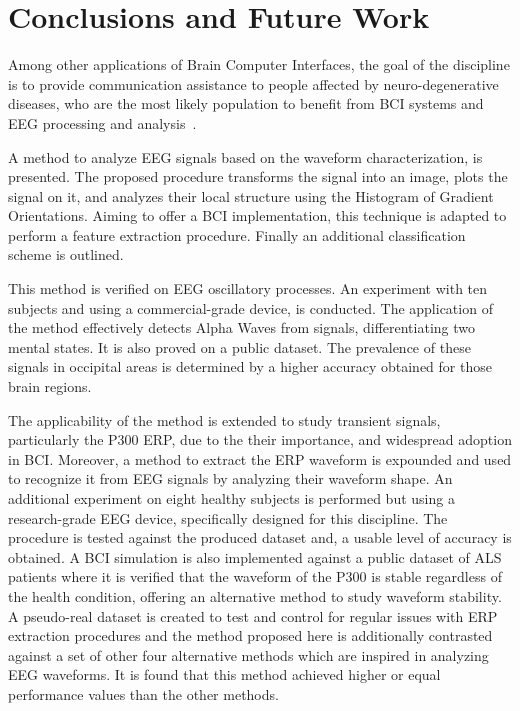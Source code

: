 \chapter{Conclusions and Future Work}
\label{chapter:seven}


Among other applications of Brain Computer Interfaces, the goal of the discipline is to provide communication assistance to people affected by neuro-degenerative diseases, who are the most likely population to benefit from BCI systems and EEG processing and analysis~\cite{WolpawJonathanR2012}.

A method to analyze EEG signals based on the waveform characterization, is presented. The proposed procedure transforms the signal into an image, plots the signal on it, and analyzes their local structure using the Histogram of Gradient Orientations.   Aiming to offer a BCI implementation, this technique is adapted to perform a feature extraction procedure.  Finally an additional classification scheme is outlined.

This method is verified on EEG oscillatory processes.  An experiment with ten subjects and using a commercial-grade device, is conducted.  The application of the method effectively detects Alpha Waves from signals, differentiating two mental states.  It is also proved on a public dataset.  The prevalence of these signals in occipital areas is determined by a higher accuracy obtained for those brain regions.

The applicability of the method is extended to study transient signals, particularly the P300 ERP,  due to the their importance, and widespread adoption in BCI.  Moreover, a method to  extract the ERP waveform is expounded and used to recognize it from EEG signals by analyzing their waveform shape.  An additional experiment on eight healthy subjects is performed but using a research-grade EEG device, specifically designed for this discipline.  The procedure is tested against the produced dataset and, a usable level of accuracy is obtained.  A BCI simulation is also implemented against a public dataset of ALS patients where it is verified that the waveform of the P300 is stable regardless of the health condition, offering an alternative method to study waveform stability.  A pseudo-real dataset is created to test and control for regular issues with ERP extraction procedures and the method proposed here is additionally contrasted against a set of other four alternative methods which are inspired in analyzing EEG waveforms.  It is found that this method achieved higher or equal performance values than the other methods.

